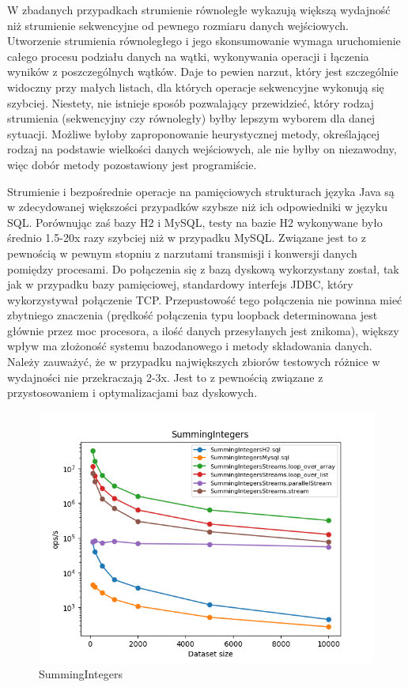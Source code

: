 \documentclass[12pt]{extarticle}
\begin{document}
    W zbadanych przypadkach strumienie równoległe wykazują większą wydajność niż strumienie sekwencyjne od pewnego rozmiaru danych wejściowych. Utworzenie strumienia równoległego i jego skonsumowanie wymaga uruchomienie całego procesu podziału danych na wątki, wykonywania operacji i łączenia wyników z poszczególnych wątków. Daje to pewien narzut, który jest szczególnie widoczny przy małych listach, dla których operacje sekwencyjne wykonują się szybciej. Niestety, nie istnieje sposób pozwalający przewidzieć, który rodzaj strumienia (sekwencyjny czy równoległy) byłby lepszym wyborem dla danej sytuacji. Możliwe byłoby zaproponowanie heurystycznej metody, określającej rodzaj na podstawie wielkości danych wejściowych, ale nie byłby on niezawodny, więc dobór metody pozostawiony jest programiście.

    Strumienie i bezpośrednie operacje na pamięciowych strukturach języka Java są w zdecydowanej większości przypadków szybsze niż ich odpowiedniki w języku SQL. Porównując zaś bazy H2 i MySQL, testy na bazie H2 wykonywane było średnio 1.5-20x razy szybciej niż w przypadku MySQL. Związane jest to z pewnością w pewnym stopniu z narzutami transmisji i konwersji danych pomiędzy procesami. Do połączenia się z bazą dyskową wykorzystany został, tak jak w przypadku bazy pamięciowej, standardowy interfejs JDBC, który wykorzystywał połączenie TCP. Przepustowość tego połączenia nie powinna mieć zbytniego znaczenia (prędkość połączenia typu loopback determinowana jest głównie przez moc procesora, a ilość danych przesyłanych jest znikoma), większy wpływ ma złożoność systemu bazodanowego i metody składowania danych. Należy zauważyć, że w przypadku największych zbiorów testowych różnice w wydajności nie przekraczają 2-3x. Jest to z pewnością związane z przystosowaniem i optymalizacjami baz dyskowych.

\begin{figure}[H]
\centering
\includegraphics[width=13cm]{plots/SummingIntegers}
\caption{SummingIntegers}
\end{figure}
\end{document}
